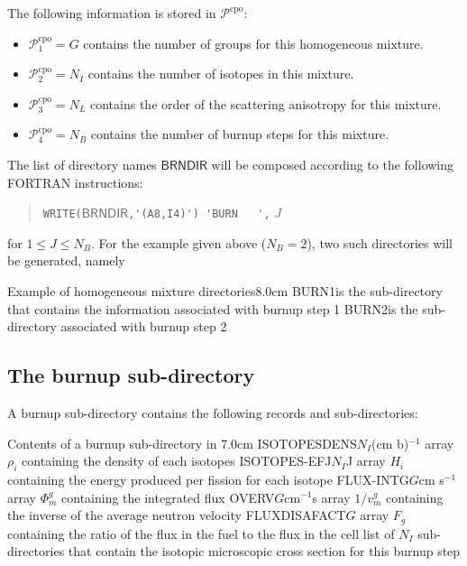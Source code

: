 The following information is stored in $\mathcal{P}^{\text{cpo}}$:

\begin{itemize}
\item $\mathcal{P}^{\text{cpo}}_{1}=G$ contains the number of groups for this homogeneous mixture.
\item $\mathcal{P}^{\text{cpo}}_{2}=N_{I}$ contains the number of isotopes in this mixture.
\item $\mathcal{P}^{\text{cpo}}_{3}=N_{L}$ contains the order of the scattering anisotropy for this mixture.
\item $\mathcal{P}^{\text{cpo}}_{4}=N_{B}$ contains the number of burnup steps for this mixture.
\end{itemize}

The list of directory  names $\mathsf{BRNDIR}$ will be composed according to the following
FORTRAN instructions:
\begin{quote}
\verb|WRITE(|$\mathsf{BRNDIR}$\verb|,'(A8,I4)') 'BURN   ',| $J$
\end{quote}
  for $1\leq J \leq N_{B}$. For the example given above ($N_{B}=2$), two such directories will be
generated, namely

\begin{DescriptionEnregistrement}{Example of homogeneous mixture directories}{8.0cm}
\DirEnr
  {BURN1}{is the sub-directory that contains the information associated with
   burnup step 1}
\DirEnr
  {BURN2}{is the sub-directory associated with burnup step 2}
\end{DescriptionEnregistrement}

\subsection{The burnup sub-directory}\label{sect:cpodirburnup}

A burnup sub-directory contains the following records and sub-directories:

\begin{DescriptionEnregistrement}{Contents of a burnup sub-directory in }{7.0cm}
\RealEnr
  {ISOTOPESDENS}{$N_{I}$}{(cm b)$^{-1}$}
  {array $\rho_{i}$ containing the density of each isotopes}
\RealEnr
  {ISOTOPES-EFJ}{$N_{I}$}{J}
  {array $H_{i}$ containing the energy produced per fission for each isotope}
\RealEnr
  {FLUX-INTG}{$G$}{cm s$^{-1}$}  
  {array $\Phi_{m}^{g}$ containing the integrated flux}
\RealEnr
  {OVERV}{$G$}{cm$^{-1}$s}  
  {array $1/v_{m}^{g}$ containing the inverse of the average neutron velocity}
\RealEnr
  {FLUXDISAFACT}{$G$}{}
  {array $F_{g}$ containing the ratio of the flux in the fuel to the flux in the cell}
\DirVar
  {}
  {list of $N_{I}$ sub-directories that contain the isotopic microscopic cross section 
   for this burnup step}
\end{DescriptionEnregistrement}

